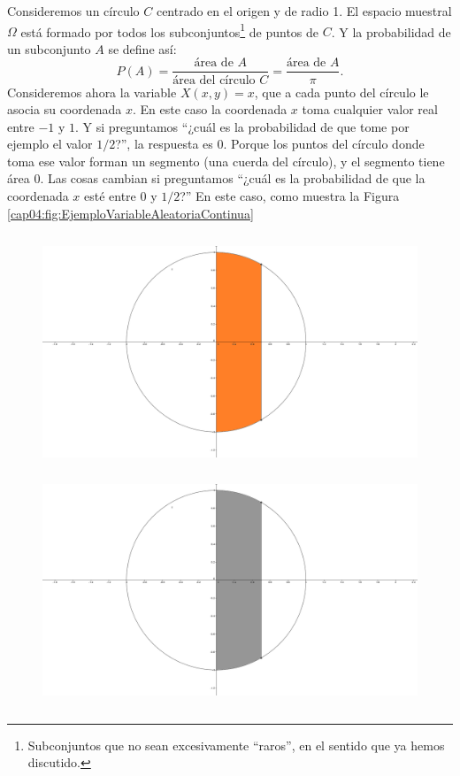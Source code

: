 \begin{Ejemplo}\label{ejem:ProbabilidadGeometricaSubconjuntosCirculo}
    Consideremos un círculo $C$ centrado en el origen y de radio 1. El espacio muestral $\Omega$ está formado por todos los subconjuntos\footnote{Subconjuntos que no sean excesivamente ``raros'', en el sentido que ya hemos discutido.} de puntos de $C$. Y la probabilidad de un subconjunto $A$ se define así:
    \[P(A)=\dfrac{\mbox{área de }A}{\mbox{área del círculo }C} = \dfrac{\mbox{área de }A}{\pi}.\]
    Consideremos ahora la variable $X(x,y)=x$, que a cada punto del círculo le asocia su coordenada $x$. En este caso la coordenada $x$ toma cualquier valor real entre $-1$ y $1$. Y si preguntamos {``¿cuál es la probabilidad de que tome por ejemplo el valor $1/2$?''}, la respuesta es $0$. Porque los puntos del círculo donde toma ese valor forman un segmento (una cuerda del círculo), y el segmento tiene área $0$. Las cosas cambian si preguntamos {``¿cuál es la probabilidad de que la coordenada $x$ esté entre $0$ y $1/2$?''} En este caso, como muestra la Figura \ref{cap04:fig:EjemploVariableAleatoriaContinua}
    \begin{figure}[h]
	\centering
	\begin{enColor}
    \includegraphics[height=7cm]{../fig/Cap04-Figura01-VariableAleatoriaContinua.png}
	\end{enColor}
	\begin{bn}
    \includegraphics[height=7cm]{../fig/Cap04-Figura01-VariableAleatoriaContinua-bn.png}

\end{bn}
\end{figure}
\end{Ejemplo}
